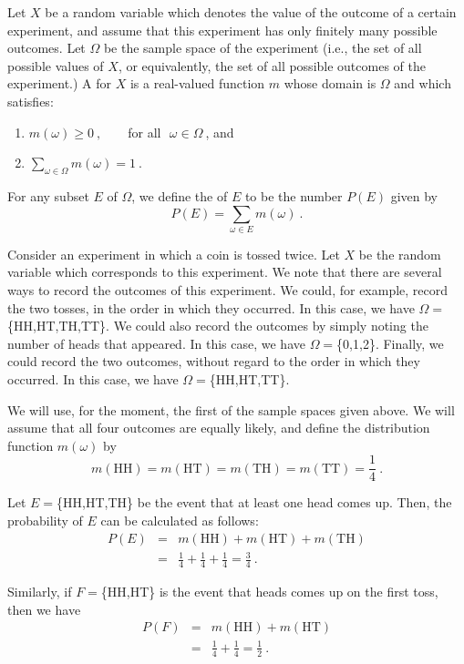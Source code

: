 \begin{definition}\label{def 1.2} 
\leanok
Let $X$ be a random variable which denotes the value of the outcome of a certain experiment,
and assume that this experiment has only finitely many possible outcomes.  Let $\Omega$ be the
sample space of the experiment (i.e., the set of all possible values of $X$, or equivalently,
the set of all possible outcomes of the experiment.)  A  for $X$ is a real-valued
function $m$ whose domain is $\Omega$ and which satisfies:
\begin{enumerate}
\item $m(\omega) \geq 0\ , \qquad$for all $\,\,\omega\in\Omega\ $, and  
\medbreak
\item $\sum\limits_{\omega \in \Omega} m(\omega) = 1\ $.  
\end{enumerate}
For any subset $E$ of $\Omega$, we define the 
of
$E$ to be the number $P(E)$ given by
$$
P(E) = \sum_{\omega\in E} m(\omega)\ .
$$
\end{definition}
 
\begin{example}\label{exam 1.6}
Consider an experiment in which a coin is tossed twice.  Let $X$ be the random variable which
corresponds to this experiment.  We note that there are several ways to record the outcomes of
this experiment.  We could, for example, record the two tosses, in the order in which they
occurred.  In this case, we have $\Omega = $\{HH,HT,TH,TT\}.  We could also record the outcomes
by simply noting the number of heads that appeared.  In this case, we have $\Omega =
$\{0,1,2\}.  Finally, we could record the two outcomes, without regard to the order in
which they occurred.  In this case, we have $\Omega = $\{HH,HT,TT\}.
\par
We will use, for the moment, the first of the sample spaces given above.  We will assume that
all four outcomes are equally likely, and define the distribution function $m(\omega)$ by
$$
m(\mbox{HH}) = m(\mbox{HT}) = m(\mbox{TH}) = m(\mbox{TT}) = \frac14\ .
$$
\par
Let $E = $\{HH,HT,TH\} be the event that at least one head comes up.  Then, the probability
of $E$ can be calculated as follows: 
\begin{eqnarray*}
P(E) &=& m(\mbox{HH}) + m(\mbox{HT}) + m(\mbox{TH}) \\
     &=& \frac14 + \frac14 + \frac14 = \frac34\ .
\end{eqnarray*}

Similarly, if $F = $\{HH,HT\} is the event that heads comes up on the first toss, then we have
\begin{eqnarray*}
P(F) &=& m(\mbox{HH}) + m(\mbox{HT}) \\
     &=& \frac14 + \frac14 = \frac12\ .
\end{eqnarray*}
\end{example}
 

